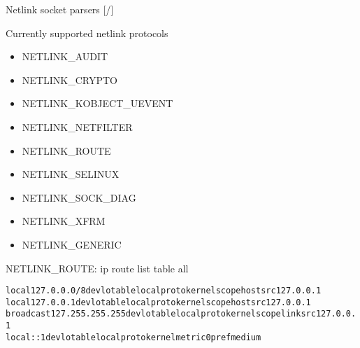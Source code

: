 \documentclass[unicode,aspectratio=169,xcolor={table,dvipsnames,usernames}]{beamer}
\begin{document}
\begin{frame}[fragile]{Netlink socket parsers \hfill [\insertframenumber/\inserttotalframenumber]}
\scriptsize
\begin{block}{\large Currently supported netlink protocols}
\begin{itemize}
\item NETLINK\_AUDIT
\item NETLINK\_CRYPTO
\item NETLINK\_KOBJECT\_UEVENT
\item NETLINK\_NETFILTER
\item NETLINK\_ROUTE
\item NETLINK\_SELINUX
\item NETLINK\_SOCK\_DIAG
\item NETLINK\_XFRM
\item NETLINK\_GENERIC
\end{itemize}
\end{block}
\begin{block}{\large NETLINK\_ROUTE: ip route list table all}
\begin{alltt}
local 127.0.0.0/8 dev lo table local proto kernel scope host src 127.0.0.1
local 127.0.0.1 dev lo table local proto kernel scope host src 127.0.0.1
broadcast 127.255.255.255 dev lo table local proto kernel scope link src 127.0.0.1
local ::1 dev lo table local proto kernel metric 0 pref medium
\end{alltt}
\end{block}
\end{frame}
\end{document}
